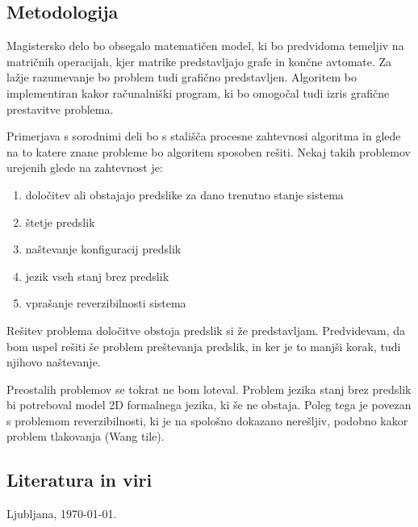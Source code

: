 \documentclass[a4paper, 12pt]{article}
\begin{document}
\subsection{Metodologija}

Magistersko delo bo obsegalo matematičen model, ki bo predvidoma temeljiv na matričnih operacijah,
kjer matrike predstavljajo grafe in končne avtomate.
Za lažje razumevanje bo problem tudi grafično predstavljen.
Algoritem bo implementiran kakor računalniški program, ki bo omogočal tudi izris grafične prestavitve
problema.

Primerjava s sorodnimi deli bo s stališča procesne zahtevnosi algoritma in glede na to
katere znane probleme bo algoritem sposoben rešiti. Nekaj takih problemov urejenih glede na zahtevnost je:
\begin{enumerate}
\item določitev ali obstajajo predslike za dano trenutno stanje sistema
\item štetje predslik
\item naštevanje konfiguracij predslik
\item jezik vseh stanj brez predslik
\item vprašanje reverzibilnosti sistema
\end{enumerate}

Rešitev problema določitve obstoja predslik si že predstavljam. 
Predvidevam, da bom uspel rešiti še problem preštevanja predslik, in ker je to manjši korak, tudi njihovo naštevanje.

Preostalih problemov se tokrat ne bom loteval.
Problem jezika stanj brez predslik bi potreboval model 2D formalnega jezika, ki še ne obstaja.
Poleg tega je povezan s problemom reverzibilnosti, ki je na spološno dokazano nerešljiv, podobno kakor problem tlakovanja (Wang tile).

\subsection{Literatura in viri}
\label{literatura}

\renewcommand\refname{}
\vspace{-50px}




\bigskip

Ljubljana, \today .
\end{document}
